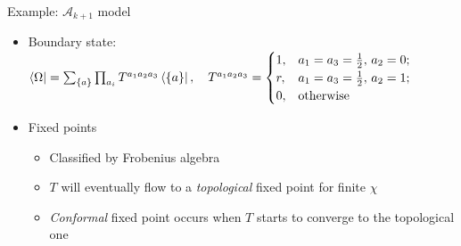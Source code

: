 \documentclass{fdubeamer}
\begin{document}
\begin{frame}{Example: \texorpdfstring{$\mathcal{A}_{k+1}$}{𝒜ₖ₊₁} model}

\begin{itemize}
  \item Boundary state: \\
    \begingroup
      \scriptsize
      \mbox{\qquad}
      $
        \bra{\Omega} = \sum_{\{a\}} \prod_{a_i} T^{a_1 a_2 a_3} \bra{\{a\}}, \quad 
        T^{a_1 a_2 a_3} = \begin{cases}
          1, & a_1 = a_3 = \frac12, \, a_2 = 0; \\
          r, & a_1 = a_3 = \frac12, \, a_2 = 1; \\
          0, & \mathrm{otherwise}
        \end{cases}
      $
    \endgroup

  \item Fixed points

    \begin{itemize}
      \item Classified by Frobenius algebra
      \item $T$ will eventually flow to a \emph{topological} fixed point for finite $\chi$
      \item \emph{Conformal} fixed point occurs when $T$ starts to converge to the topological one
    \end{itemize}
\end{itemize}

\end{frame}
\end{document}
